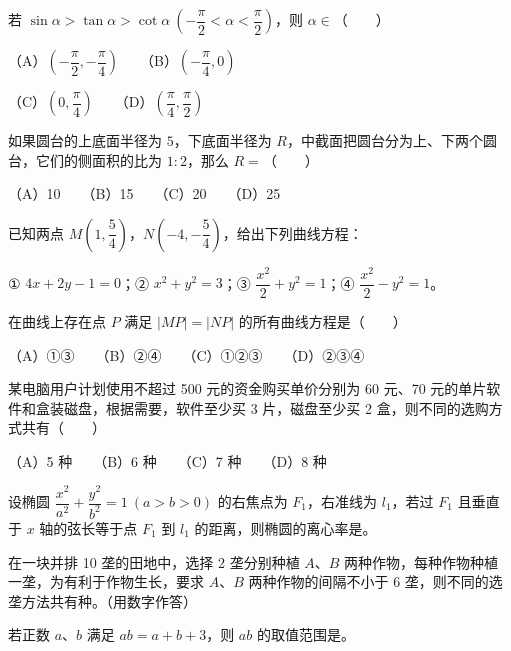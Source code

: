 \begin{question}
若 $\sin\alpha>\tan\alpha>\cot\alpha\ \left(-\dfrac\pi2<\alpha<\dfrac\pi2\right)$，则 $\alpha\in$\mbox{（　　）}

（A）$\left(-\dfrac\pi2,-\dfrac\pi4\right)$　　（B）$\left(-\dfrac\pi4,0\right)$

（C）$\left(0,\dfrac\pi4\right)$　　（D）$\left(\dfrac\pi4,\dfrac\pi2\right)$

\end{question}
\begin{question}
如果圆台的上底面半径为 $5$，下底面半径为 $R$，中截面把圆台分为上、下两个圆台，它们的侧面积的比为 $1:2$，那么 $R=$\mbox{（　　）}

（A）10　　（B）15　　（C）20　　（D）25

\end{question}
\begin{question}
已知两点 $M\left(1,\dfrac54\right)$，$N\left(-4,-\dfrac54\right)$，给出下列曲线方程：

① $4x+2y-1=0$；② $x^2+y^2=3$；③ $\dfrac{x^2}{2}+y^2=1$；④ $\dfrac{x^2}{2}-y^2=1$。

在曲线上存在点 $P$ 满足 $|MP|=|NP|$ 的所有曲线方程是\mbox{（　　）}

（A）①③　　（B）②④　　（C）①②③　　（D）②③④

\end{question}
\begin{question}
某电脑用户计划使用不超过 500 元的资金购买单价分别为 60 元、70 元的单片软件和盒装磁盘，根据需要，软件至少买 3 片，磁盘至少买 2 盒，则不同的选购方式共有\mbox{（　　）}

（A）5 种　　（B）6 种　　（C）7 种　　（D）8 种

\end{question}
\begin{question}
设椭圆 $\dfrac{x^2}{a^2}+\dfrac{y^2}{b^2}=1\ (a>b>0)$ 的右焦点为 $F_1$，右准线为 $l_1$，若过 $F_1$ 且垂直于 $x$ 轴的弦长等于点 $F_1$ 到 $l_1$ 的距离，则椭圆的离心率是\gkblank{}。

\end{question}
\begin{question}
在一块并排 10 垄的田地中，选择 2 垄分别种植 $A$、$B$ 两种作物，每种作物种植一垄，为有利于作物生长，要求 $A$、$B$ 两种作物的间隔不小于 6 垄，则不同的选垄方法共有\gkblank{}种。（用数字作答）

\end{question}
\begin{question}
若正数 $a$、$b$ 满足 $ab=a+b+3$，则 $ab$ 的取值范围是\gkblank{}。

\end{question}
